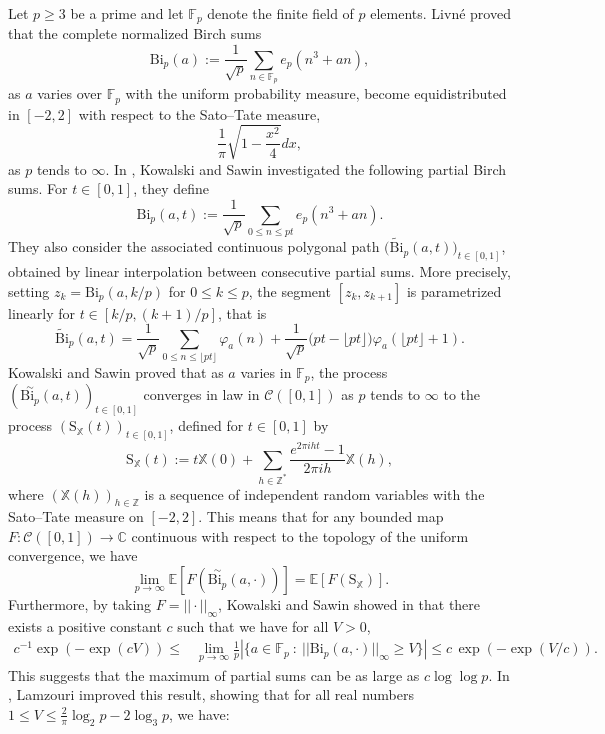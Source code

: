 \documentclass[12pt]{amsart}
\theoremstyle{definition}
\numberwithin{equation}{section}
\numberwithin{equation}{section}
\def\F{\mathbb{F}}
\def\E{\mathbb{E}}
\def\C{\mathbb{C}}
\def\Ccal{\mathcal{C}}
\def\Z{\mathbb{Z}}
\def\Bi{\mathrm{Bi}}
\def\S{\mathrm{S}}
\def\X{\mathbb{X}}
\def\E{\mathbb{E}}
\begin{document}
Let $p\geq 3$ be a prime and let $\mathbb{F}_p$ denote the finite field of $p$ elements. Livné \cite{Liv87} proved that the complete normalized Birch sums
\[
\Bi_p(a):= \frac{1}{\sqrt{p}}\sum_{n\in \F_p} e_p(n^3+an),
\]as $a$ varies over $\F_p$ with the uniform probability measure, become equidistributed in $[-2,2]$ with respect to the Sato--Tate measure, 
\[
    \frac{1}{\pi}\sqrt{1-\frac{x^2}{4}}dx,
    \]
as $p$ tends to $\infty$. 
In \cite{KS16}, Kowalski and Sawin investigated the following partial Birch sums. 
For $t \in [0,1]$, they define
\[
\Bi_p(a, t):= \frac{1}{\sqrt{p}}\sum_{0\leq n\leq pt} e_p(n^3+an).
\]
They also consider the associated continuous polygonal path 
$\big(\widetilde{\Bi}_p(a,t)\big)_{t\in[0,1]}$, obtained by linear interpolation 
between consecutive partial sums. More precisely, setting  
$z_k=\Bi_p(a,k/p)$ for $0\leq k\leq p$, the segment $[z_k,z_{k+1}]$ 
is parametrized linearly for $t\in[k/p,(k+1)/p]$, that is
\[
\widetilde{\Bi}_p(a,t)
= \frac{1}{\sqrt{p}}\sum_{0\leq n\leq \lfloor pt \rfloor}\varphi_a(n)
+ \frac{1}{\sqrt{p}}\big(pt-\lfloor pt\rfloor\big)\varphi_a(\lfloor pt\rfloor+1).
\]
Kowalski and Sawin
proved that as $a$ varies in $\F_p$, the process $(\overset{\sim}{\Bi_p}(a,t))_{t\in[0,1]}$ converges in law in $\Ccal([0,1])$ as $p$ tends to $\infty$ to the process $(\S_\X(t))_{t\in [0,1]}$, defined for $t\in[0,1]$ by
\begin{equation}\label{def S_X(t)}
\S_\X(t) := t \X(0)+ \sum_{h\in\Z^*} \frac{e^{2\pi i ht}-1}{2\pi i h} \X(h),
\end{equation}
where $(\X(h))_{h\in\Z}$ is a sequence of independent random variables with the Sato--Tate measure on $[-2,2]$.
This means that for any bounded map $F : \Ccal([0,1]) \to \C$ continuous with respect to the topology of the uniform convergence, we have 
\[
\underset{p \to \infty }{\lim}\E[F(\overset{\sim}{\Bi_p}(a,\cdot) )] = \E [ F(\S_\X) ].
\] 
Furthermore, by taking $F = ||\cdot||_\infty$, Kowalski and Sawin showed in \cite{KS16} that
there exists a positive constant $c$ such that we have for all $V>0$,
\begin{align*}
c^{-1}\exp(-\exp(cV))\leq
& \underset{p\rightarrow \infty}{\lim} \frac{1}{p}\left| \Big\{
a\in \F_p 
\:: \
||\Bi_p(a,\cdot) ||_\infty \geq V
\Big\}\right| 
\leq c\,\exp(-\exp(V/c)).
\end{align*}
This suggests that the maximum of partial sums can be as large as $c\log\log p$. In \cite{Lam20}, Lamzouri improved this result, showing that for all real numbers $1\leq V\leq \frac{2}{\pi}\log_2 p-2\log_3 p$, we have:
\end{document}
